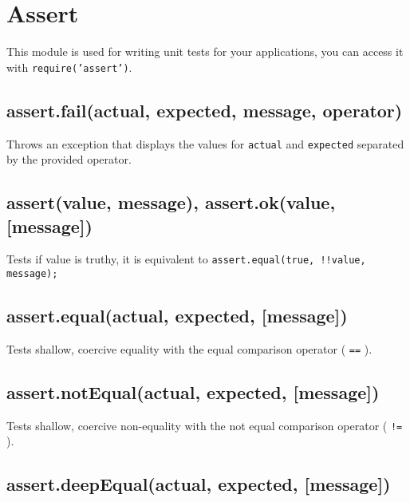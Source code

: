\section{Assert}\label{assert}

\begin{Shaded}
\begin{Highlighting}[]
 
\end{Highlighting}
\end{Shaded}

This module is used for writing unit tests for your applications, you
can access it with \texttt{require('assert')}.

\subsection{assert.fail(actual, expected, message,
operator)}\label{assert.failactual-expected-message-operator}

Throws an exception that displays the values for \texttt{actual} and
\texttt{expected} separated by the provided operator.

\subsection{assert(value, message), assert.ok(value,
{[}message{]})}\label{assertvalue-message-assert.okvalue-message}

Tests if value is truthy, it is equivalent to
\texttt{assert.equal(true, !!value, message);}

\subsection{assert.equal(actual, expected,
{[}message{]})}\label{assert.equalactual-expected-message}

Tests shallow, coercive equality with the equal comparison operator (
\texttt{==} ).

\subsection{assert.notEqual(actual, expected,
{[}message{]})}\label{assert.notequalactual-expected-message}

Tests shallow, coercive non-equality with the not equal comparison
operator ( \texttt{!=} ).

\subsection{assert.deepEqual(actual, expected,
{[}message{]})}\label{assert.deepequalactual-expected-message}

